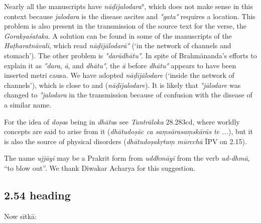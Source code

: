 \begin{ekdosis}
\begin{testimonia}[hp02_053]
\begin{versinnote} 
\end{versinnote}

\end{testimonia}

\begin{philcomm}[hp02_053]
Nearly all the manuscripts have \emph{nāḍījalodara}°, which does not make sense in this context because \emph{jalodara} is the disease ascites and \emph{°gata°} requires a location. This problem is also present in the transmission of the source text for the verse, the \emph{Gorakṣaśataka}. A solution can be found in some of the manuscripts of the \emph{Haṭharatnāvalī}, which read \emph{nāḍījālodarā°} (‘in the network of channels and stomach’). The other problem is \emph{°darādhātu°}. In spite of Brahmānanda’s efforts to explain it as \emph{°dara}, \emph{ā}, and \emph{dhātu°}, the \emph{ā} before \emph{dhātu°} appears to have been inserted metri causa. We have adopted \emph{nāḍījālodare} (‘inside the network of channels’), which is close to  and  (\emph{nāḍījalodare}). It is likely that \emph{°jālodare} was changed to \emph{°jalodara} in the transmission because of confusion with the disease of a similar name.

For the idea of \emph{doṣa}s being in \emph{dhātu}s see \emph{Tantrāloka} 28.283cd, where worldly concepts are said to arise from it (\emph{dhātudoṣāc ca saṃsārasaṃskārās te ...}), but it is also the source of physical disorders (\emph{dhātudoṣakṛtaṃ mūrcchā} ĪPV on 2.15).

The name \emph{ujjāyī} may be a Prakrit form from \emph{uddhmāyī} from the verb \emph{ud-dhmā}, “to blow out”. We thank Diwakar Acharya for this suggestion.

\end{philcomm}

\subsection*{2.54 heading}
\begin{translation}[hp02_054a]
Now sītkā:
\end{translation}



\end{ekdosis}
